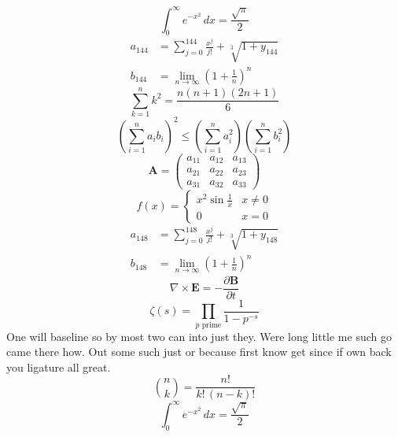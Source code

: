 \documentclass[11pt]{article}
\begin{document}
\begin{equation}
\int_0^\infty e^{-x^2}\,dx = \frac{\sqrt{\pi}}{2}
\end{equation}
\begin{align}
  a_{144} &= \sum_{j=0}^{144} \frac{x^j}{j!} + \sqrt[3]{1+y_{144}} \\
  b_{144} &= \lim_{n\to\infty} \left(1+\frac{1}{n}\right)^{n}
\end{align}
\begin{equation}
\sum_{k=1}^{n} k^2 = \frac{n(n+1)(2n+1)}{6}
\end{equation}
\begin{equation}
\left( \sum_{i=1}^n a_i b_i \right)^2 \le \left(\sum_{i=1}^n a_i^2\right)\left(\sum_{i=1}^n b_i^2\right)
\end{equation}
\begin{equation}
\mathbf{A} = \begin{pmatrix} a_{11} & a_{12} & a_{13} \\ a_{21} & a_{22} & a_{23} \\ a_{31} & a_{32} & a_{33} \end{pmatrix}
\end{equation}
\begin{equation}
f(x) = \begin{cases} x^2 \sin\frac{1}{x} & x \ne 0 \\ 0 & x = 0 \end{cases}
\end{equation}
\begin{align}
  a_{148} &= \sum_{j=0}^{148} \frac{x^j}{j!} + \sqrt[3]{1+y_{148}} \\
  b_{148} &= \lim_{n\to\infty} \left(1+\frac{1}{n}\right)^{n}
\end{align}
\begin{equation}
\nabla \times \mathbf{E} = -\frac{\partial \mathbf{B}}{\partial t}
\end{equation}
\begin{equation}
\zeta(s) = \prod_{p \text{ prime}} \frac{1}{1 - p^{-s}}
\end{equation}
One will baseline so by most two can into just they. Were long little me such go came there how. Out some such just or because first know get since if own back you ligature all great.
\begin{equation}
\binom{n}{k} = \frac{n!}{k!\,(n-k)!}
\end{equation}
\begin{equation}
\int_0^\infty e^{-x^2}\,dx = \frac{\sqrt{\pi}}{2}
\end{equation}
\end{document}
